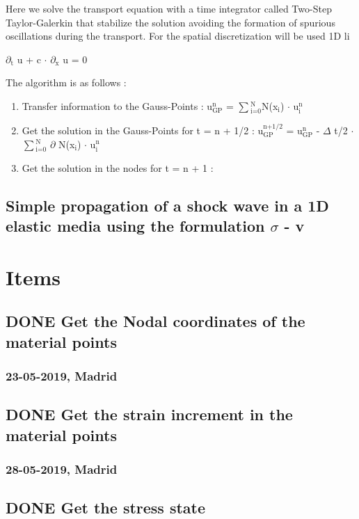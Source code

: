 \documentclass[11pt]{article}
\begin{document}
Here we solve the transport equation with a time integrator called Two-Step Taylor-Galerkin that stabilize the solution avoiding the formation of spurious oscillations during the transport. For the spatial discretization will be used 1D li

$\partial$$_{\text{t}}$ u + c $\cdot$ $\partial$$_{\text{x}}$ u = 0

The algorithm is as follows : 
\begin{enumerate}
\item Transfer information to the Gauss-Points :  u$^{\text{n}}_{\text{GP}}$ = $\sum$$^{\text{N}}_{\text{i=0}}$N(x$_{\text{i}}$) $\cdot$ u$^{\text{n}}_{\text{i}}$
\item Get the solution in the Gauss-Points for t = n + 1/2 : u$^{\text{n+1/2}}_{\text{GP}}$ = u$^{\text{n}}_{\text{GP}}$ - $\Delta$ t/2 $\cdot$ $\sum$$^{\text{N}}_{\text{i=0}}$ $\partial$ N(x$_{\text{i}}$) $\cdot$ u$^{\text{n}}_{\text{i}}$
\item Get the solution in the nodes for t = n + 1 :
\end{enumerate}

\subsection{Simple propagation of a shock wave in a 1D elastic media using the formulation $\sigma$ - v}
\label{sec-3-2}


\section{Items}
\label{sec-4}

\subsection{{\bfseries\sffamily DONE} Get the Nodal coordinates of the material points}
\label{sec-4-1}

\subsubsection{23-05-2019, Madrid}
\label{sec-4-1-1}

\subsection{{\bfseries\sffamily DONE} Get the strain increment in the material points}
\label{sec-4-2}

\subsubsection{28-05-2019, Madrid}
\label{sec-4-2-1}
\subsection{{\bfseries\sffamily DONE} Get the stress state}
\label{sec-4-3}
\end{document}
